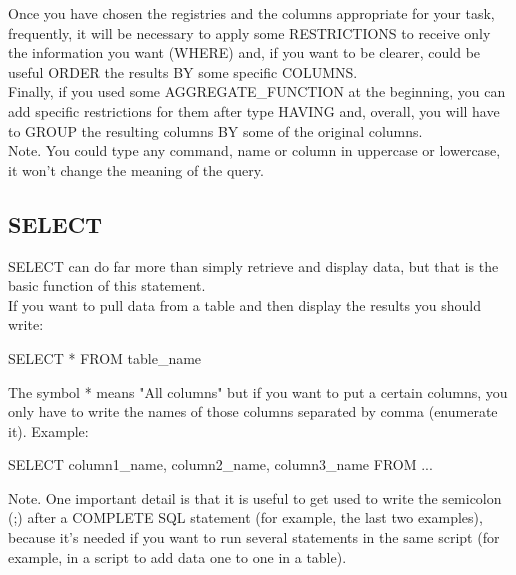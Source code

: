 \documentclass[10pt, oneside]{article}
\begin{document}
	Once you have chosen the registries and the columns appropriate for your task, frequently, it will be necessary to apply some RESTRICTIONS to receive only the information you want (WHERE) and, if you want to be clearer, could be useful ORDER the results BY some specific COLUMNS. 
	\\
	
	Finally, if you used some AGGREGATE\_FUNCTION at the beginning, you can add specific restrictions for them after type HAVING and, overall, you will have to GROUP the resulting columns BY some of the original columns.
	\\
	
	\color{blue} Note. \color{black}You could type any command, name or column in uppercase or lowercase, it won't change the meaning of the query.

\subsection{SELECT}

SELECT can do far more than simply retrieve and display data, but that is the basic function of this statement.
\\

If you want to pull data from a table and then display the results you should write:

\begin{center}
	SELECT * FROM table\_name
\end{center}

The symbol * means "All columns" but if you want to put a certain columns, you only have to write the names of those columns separated by comma (enumerate it).
Example: 

\begin{center}
	SELECT column1\_name, column2\_name, column3\_name FROM ...
\end{center}

\color{blue}Note. \color{black}One important detail is that it is useful to get used to write the semicolon (;) after a COMPLETE SQL statement (for example, the last two examples), because it's needed if you want to run several statements in the same script (for example, in a script to add data one to one in a table).
\end{document}
